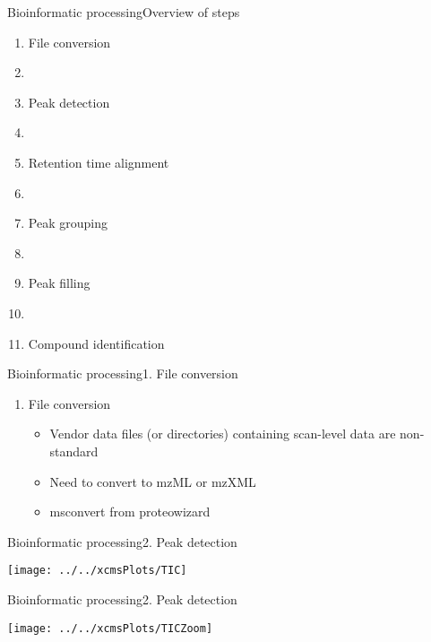 \documentclass[xcolor=dvipsnames]{beamer}
\begin{document}
\begin{frame}{Bioinformatic processing}{Overview of steps}
\vspace{-10pt}
\begin{enumerate}
	[default]
	\item File conversion
	\item[]
	\item Peak detection
	\item[]
	\item Retention time alignment
	\item[]
	\item Peak grouping
	\item[]
	\item Peak filling
	\item[]
	\item Compound identification
\end{enumerate}
\end{frame}

\begin{frame}{Bioinformatic processing}{1. File conversion}
\vspace{-10pt}
	\begin{enumerate}
 [default]
		\item File conversion
		\begin{itemize}
			\item Vendor data files (or directories) containing scan-level data are non-standard
			\item Need to convert to mzML or mzXML
			\item msconvert from proteowizard
		\end{itemize}
	\end{enumerate}
\end{frame}

\begin{frame}{Bioinformatic processing}{2. Peak detection}
\vspace{-7pt}
\begin{center}
	\texttt{[image: ../../xcmsPlots/TIC]}
\end{center}
\end{frame}

\begin{frame}{Bioinformatic processing}{2. Peak detection}
\vspace{-7pt}
\begin{center}
	\texttt{[image: ../../xcmsPlots/TICZoom]}
\end{center}
\end{frame}
\end{document}
